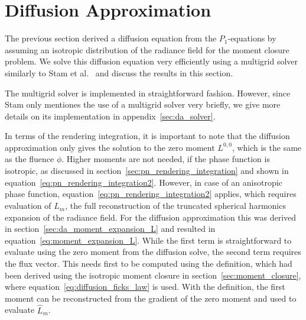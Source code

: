 \section{Diffusion Approximation}

\label{sec:diffusion_approximation}

The previous section derived a diffusion equation from the $P_1$-equations by assuming an isotropic distribution of the radiance field for the moment closure problem. We solve this diffusion equation very efficiently using a multigrid solver similarly to Stam et al.~\cite{Stam95} and discuss the results in this section.

The multigrid solver is implemented in straightforward fashion. However, since Stam only mentiones the use of a multigrid solver very briefly, we give more details on its implementation in appendix~\ref{sec:da_solver}.

In terms of the rendering integration, it is important to note that the diffusion approximation only gives the solution to the zero moment $L^{0,0}$, which is the same as the fluence $\phi$. Higher moments are not needed, if the phase function is isotropic, as discussed in section~\ref{sec:pn_rendering_integration} and shown in equation~\ref{eq:pn_rendering_integration2}. However, in case of an anisotropic phase function, equation~\ref{eq:pn_rendering_integration2} applies, which requires evaluation of $\widehat{L}_m$, the full reconstruction of the truncated spherical harmonics expansion of the radiance field. For the diffusion approximation this was derived in section~\ref{sec:da_moment_expansion_L} and resulted in equation~\ref{eq:moment_expansion_L}. While the first term is straightforward to evaluate using the zero moment from the diffusion solve, the second term requires the flux vector. This needs first to be computed using the definition, which had been derived using the isotropic moment closure in section~\ref{sec:moment_closure}, where equation~\ref{eq:diffusion_ficks_law} is used. With the definition, the first moment can be reconstructed from the gradient of the zero moment and used to evaluate $\widehat{L}_m$.

